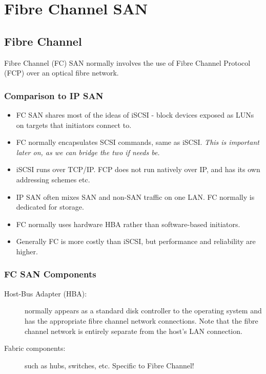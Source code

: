 \chapter{Fibre Channel SAN}
\label{ch:fc-san}

\section{Fibre Channel}
\label{sec:fibre-channel}

Fibre Channel (FC) SAN normally involves the use of Fibre Channel
Protocol (FCP) over an optical fibre network.

\subsection{Comparison to IP SAN}
\label{sec:comparison-to-ip-san}

\begin{itemize}
\item
  FC SAN shares most of the ideas of iSCSI - block devices exposed as
  LUNs on targets that initiators connect to.
\item
  FC normally encapsulates SCSI commands, same as iSCSI. \emph{This is
  important later on, as we can bridge the two if needs be.}
\item
  iSCSI runs over TCP/IP. FCP does not run natively over IP, and has its
  own addressing schemes etc.
\item
  IP SAN often mixes SAN and non-SAN traffic on one LAN. FC normally is
  dedicated for storage.
\item
  FC normally uses hardware HBA rather than software-based initiators.
\item
  Generally FC is more costly than iSCSI, but performance and
  reliability are higher.
\end{itemize}

\subsection{FC SAN Components}
\label{sec:fc-san-components}

\begin{description}
\item[Host-Bus Adapter (HBA):]
normally appears as a standard disk controller to the operating system
and has the appropriate fibre channel network connections. Note that the
fibre channel network is entirely separate from the host's LAN
connection.
\item[Fabric components:]
such as hubs, switches, etc. Specific to Fibre Channel!
\end{description}

